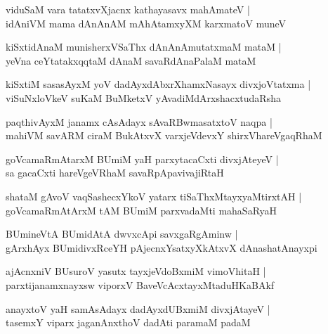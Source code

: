 \setcounter{shloka}{0}
\begin{shloka}
viduSaM vara tatatxvXjacnx kathayasavx mahAmateV |\\
idAniVM mama dAnAnAM mAhAtamxyXM karxmatoV muneV 
\end{shloka}

\begin{shloka}
kiSxtidAnaM munisherxVSaThx dAnAnAmutatxmaM mataM |\\
yeVna ceYtatakxqqtaM dAnaM savaRdAnaPalaM mataM 
\end{shloka}

\begin{shloka}
kiSxtiM sasasAyxM yoV dadAyxdAbxrXhamxNasayx divxjoVtatxma |\\
viSuNxloVkeV suKaM BuMketxV yAvadiMdArxshacxtudaRsha
\end{shloka}

\begin{shloka}
paqthivAyxM janamx cAsAdayx sAvaRBwmasatxtoV naqpa |\\
mahiVM savARM ciraM BukAtxvX varxjeVdevxY shirxVhareVgaqRhaM 
\end{shloka}

\begin{shloka}
goVcamaRmAtarxM BUmiM yaH parxytacaCxti divxjAteyeV |\\
sa gacaCxti hareVgeVRhaM savaRpApavivajiRtaH
\end{shloka}

\begin{shloka}
shataM gAvoV vaqSashecxYkoV yatarx tiSaThxMtayxyaMtirxtAH |\\
goVcamaRmAtArxM tAM BUmiM parxvadaMti mahaSaRyaH 
\end{shloka}

\begin{shloka}
BUmineVtA BUmidAtA dwvxcApi savxgaRgAminw |\\
gArxhAyx BUmidivxRceYH pAjecnxYsatxyXkAtxvX dAnashatAnayxpi
\end{shloka}

\begin{shloka}
ajAcnxniV BUsuroV yasutx tayxjeVdoBxmiM vimoVhitaH |\\
parxtijanamxnayxsw viporxV BaveVcAcxtayxMtaduHKaBAkf
\end{shloka}

\begin{shloka}
anayxtoV yaH samAsAdayx dadAyxdUBxmiM divxjAtayeV |\\
tasemxY viparx jaganAnxthoV dadAti paramaM padaM
\end{shloka}

